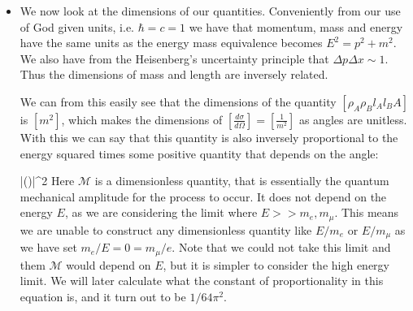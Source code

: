 \documentclass[11pt]{article}
\renewenvironment{flalign}{\vspace{-3mm}\empheq[box=\tcbhighmath]{align}}{\endempheq}
\numberwithin{equation}{section}
\begin{document}
\begin{itemize}
  \item We now look at the dimensions of our quantities. Conveniently from our use of God given units, i.e. $\hbar =c =1$ we have that momentum, mass and energy have the same units as the energy mass equivalence becomes $E^2 = p^2 + m^2$. We also have from the Heisenberg's uncertainty principle that $\Delta p \Delta x \sim 1$. Thus the dimensions of mass and length are inversely related. 

  We can from this easily see that the dimensions of the quantity $[\rho_A\rho_B l_A l_B A]$ is $[m^2]$, which makes the dimensions of $\left[\frac{d\sigma}{d \Omega}\right] = \left[\frac{1}{m^2}\right]$ as angles are unitless. With this we can say that this quantity is also inversely proportional to the energy squared times some positive quantity that depends on the angle:


\begin{flalign}
\label{diff_cross}
   \propto {}|(\theta)|^2 
\end{flalign}
Here $\mathcal{M}$ is a dimensionless quantity, that is essentially the quantum mechanical amplitude for the process to occur. It does not depend on the energy $E$, as we are considering the limit where $E >> m_e,m_{\mu}$. This means we are unable to construct any dimensionless quantity like $E/m_e$ or $E/m_{\mu}$ as we have set $m_e/E = 0 = m_{\mu}/e$. Note that we could not take this limit and them $\mathcal{M}$ would depend on $E$, but it is simpler to consider the high energy limit. We will later calculate what the constant of proportionality in this equation is, and it turn out to be $1/64\pi^2$.
\end{itemize}
\end{document}
